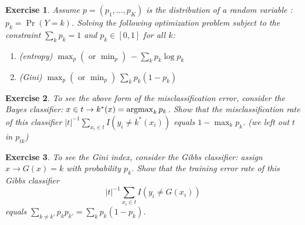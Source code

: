 \documentclass[handout]{beamer}
\def\argmax{\mathop{\rm argmax}}
\newtheorem{ex}{Exercise}
\begin{document}
\begin{frame}
\begin{ex}
Assume $p=(p_1,\ldots, p_K)$ is the distribution of a random variable :  $p_k =\Pr(Y=k)$.
Solving the following optimization problem subject to the constraint
$\sum_k p_k =1 $ and $p_k \in [0,1]$ for all $k$:
\begin{enumerate}
\item (entropy) $\max_p ( \mbox{ or } \min_p )~  -\sum_k p_k \log p_k $
\item (Gini) $\max_p  (\mbox{ or }  \min_p) ~ \sum_k p_k (1-p_k)$
\end{enumerate}
\end{ex}
\end{frame}


\begin{frame}
\begin{ex}
To see the above form of the misclassification error,
consider the Bayes classifier:
$x\in t \to  k^*(x)=\argmax_k p_{k}$.
Show that the misclassification rate of this classifier 
$
|t|^{-1} \sum_{x_i \in t}  I ( y_i \neq k^*(x_i))
$
equals   $1- \max_{k} p_{k}$.
(we left out $t$ in $p_{tk}$)
\end{ex}
\begin{ex}
To see the Gini index, 
consider the Gibbs classifier: assign 
$x\to G(x)= k$ with probability $p_{k}$. 
Show that the training error rate of this Gibbs classifier 
\[
|t|^{-1} \sum_{x_i\in t}  I ( y_i \neq G(x_i))
\]
equals    $\sum_{k\neq k'} p_k p_{k'}=\sum_{k} p_k (1-p_k)$.
\end{ex}

\end{frame}
\end{document}
